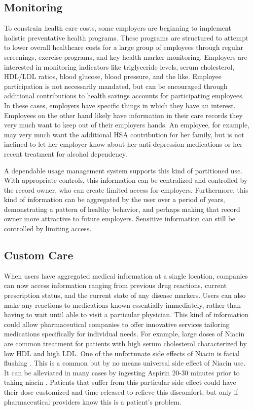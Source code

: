 \documentclass[10pt, conference, compsocconf]{IEEEtran}
\begin{document}
\subsection{Monitoring}
To constrain health care costs, some employers are beginning to implement holistic preventative health programs.  These programs are structured to attempt to lower overall healthcare costs for a large group of employees through regular screenings, exercise programs, and key health marker monitoring.  Employers are interested in monitoring indicators like triglyceride levels, serum cholesterol, HDL/LDL ratios, blood glucose, blood pressure, and the like.  Employee participation is not necessarily mandated, but can be encouraged through additional contributions to health savings accounts for participating employees.  In these cases, employers have specific things in which they have an interest. Employees on the other hand likely have information in their care records they very much want to keep out of their employers hands.  An employee, for example, may very much want the additional HSA contribution for her family, but is not inclined to let her employer know about her anti-depression medications or her recent treatment for alcohol dependency.

A dependable usage management system supports this kind of partitioned use.  With appropriate controls, this information can be centralized and controlled by the record owner, who can create limited access for employers.  Furthermore, this kind of information can be aggregated by the user over a period of years, demonstrating a pattern of healthy behavior, and perhaps making that record owner more attractive to future employers.  Sensitive information can still be controlled by limiting access.

\subsection{Custom Care}
When users have aggregated medical information at a single location, companies can now access information ranging from previous drug reactions, current prescription status, and the current state of any disease markers.  Users can also make any reactions to medications known essentially immediately, rather than having to wait until able to visit a particular physician.  This kind of information could allow pharmaceutical companies to offer innovative services tailoring medications specifically for individual needs.  For example, large doses of Niacin are common treatment for patients with high serum cholesterol characterized by low HDL and high LDL.  One of the unfortunate side effects of Niacin is facial flushing \cite{Emr:Web:Niacin}.  This is a common but by no means universal side effect of Niacin use.  It can be alleviated in many cases by ingesting Aspirin 20-30 minutes prior to taking niacin \cite{Emr:Web:Niacin}.  Patients that suffer from this particular side effect could have their dose customized and time-released to relieve this discomfort, but only if pharmaceutical providers know this is a patient's problem.
\end{document}
